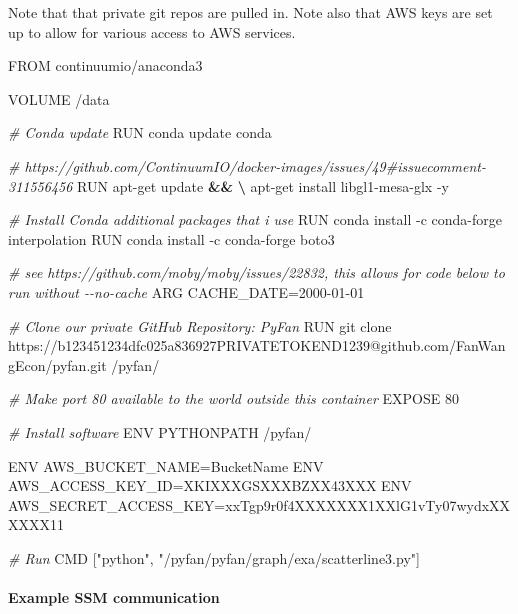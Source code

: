 \documentclass[
]{book}
\newenvironment{Shaded}{\begin{snugshade}}{\end{snugshade}}
\newcommand{\CommentTok}[1]{\textcolor[rgb]{0.56,0.35,0.01}{\textit{#1}}}
\newcommand{\ExtensionTok}[1]{#1}
\newcommand{\KeywordTok}[1]{\textcolor[rgb]{0.13,0.29,0.53}{\textbf{#1}}}
\newcommand{\NormalTok}[1]{#1}
\newcommand{\StringTok}[1]{\textcolor[rgb]{0.31,0.60,0.02}{#1}}
\begin{document}
Note that that private git repos are pulled in. Note also that AWS keys are set up to allow for various access to AWS services.

\begin{Shaded}
\begin{Highlighting}[]
\ExtensionTok{FROM}\NormalTok{ continuumio/anaconda3}

\ExtensionTok{VOLUME}\NormalTok{ /data}

\CommentTok{\# Conda update}
\ExtensionTok{RUN}\NormalTok{ conda update conda}

\CommentTok{\# https://github.com/ContinuumIO/docker{-}images/issues/49\#issuecomment{-}311556456}
\ExtensionTok{RUN}\NormalTok{ apt{-}get update }\KeywordTok{\&\&} \KeywordTok{\textbackslash{}}
    \ExtensionTok{apt{-}get}\NormalTok{ install libgl1{-}mesa{-}glx {-}y}

\CommentTok{\# Install Conda additional packages that i use}
\ExtensionTok{RUN}\NormalTok{ conda install {-}c conda{-}forge interpolation}
\ExtensionTok{RUN}\NormalTok{ conda install {-}c conda{-}forge boto3}

\CommentTok{\# see https://github.com/moby/moby/issues/22832, this allows for code below to run without {-}{-}no{-}cache}
\ExtensionTok{ARG}\NormalTok{ CACHE\_DATE=2000{-}01{-}01}

\CommentTok{\# Clone our private GitHub Repository: PyFan}
\ExtensionTok{RUN}\NormalTok{ git clone https://b123451234dfc025a836927PRIVATETOKEND1239@github.com/FanWangEcon/pyfan.git /pyfan/}

\CommentTok{\# Make port 80 available to the world outside this container}
\ExtensionTok{EXPOSE}\NormalTok{ 80}

\CommentTok{\# Install software}
\ExtensionTok{ENV}\NormalTok{ PYTHONPATH /pyfan/}

\ExtensionTok{ENV}\NormalTok{ AWS\_BUCKET\_NAME=BucketName}
\ExtensionTok{ENV}\NormalTok{ AWS\_ACCESS\_KEY\_ID=XKIXXXGSXXXBZXX43XXX}
\ExtensionTok{ENV}\NormalTok{ AWS\_SECRET\_ACCESS\_KEY=xxTgp9r0f4XXXXXXX1XXlG1vTy07wydxXXXXXX11}

\CommentTok{\# Run}
\ExtensionTok{CMD}\NormalTok{ [}\StringTok{"python"}\NormalTok{, }\StringTok{"/pyfan/pyfan/graph/exa/scatterline3.py"}\NormalTok{]}
\end{Highlighting}
\end{Shaded}

\hypertarget{example-ssm-communication}{%
\paragraph{Example SSM communication}\label{example-ssm-communication}}
\end{document}
